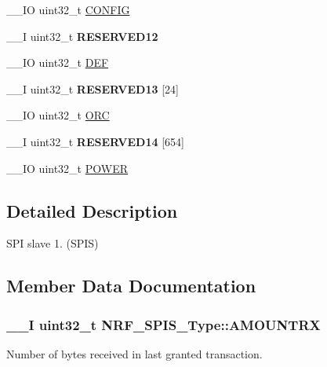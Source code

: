 \begin{DoxyCompactItemize}
\item 
\+\_\+\+\_\+\+I\+O uint32\+\_\+t \hyperlink{struct_n_r_f___s_p_i_s___type_a8a3497d5199eef5a3fc0d966857ad5a6}{C\+O\+N\+F\+I\+G}
\item 
\hypertarget{struct_n_r_f___s_p_i_s___type_ab14765fd89d9625fcff7627e9d61ef22}{}\+\_\+\+\_\+\+I uint32\+\_\+t {\bfseries R\+E\+S\+E\+R\+V\+E\+D12}\label{struct_n_r_f___s_p_i_s___type_ab14765fd89d9625fcff7627e9d61ef22}

\item 
\+\_\+\+\_\+\+I\+O uint32\+\_\+t \hyperlink{struct_n_r_f___s_p_i_s___type_ad04af03c7cf95dd2e789d87e4aba573f}{D\+E\+F}
\item 
\hypertarget{struct_n_r_f___s_p_i_s___type_a6c280b5aecac6bf0cd7d707771d43509}{}\+\_\+\+\_\+\+I uint32\+\_\+t {\bfseries R\+E\+S\+E\+R\+V\+E\+D13} \mbox{[}24\mbox{]}\label{struct_n_r_f___s_p_i_s___type_a6c280b5aecac6bf0cd7d707771d43509}

\item 
\+\_\+\+\_\+\+I\+O uint32\+\_\+t \hyperlink{struct_n_r_f___s_p_i_s___type_aa70d83790facd1d9564ee423d2927a81}{O\+R\+C}
\item 
\hypertarget{struct_n_r_f___s_p_i_s___type_a9926ca2cecd7b8a03c69df007c26ec54}{}\+\_\+\+\_\+\+I uint32\+\_\+t {\bfseries R\+E\+S\+E\+R\+V\+E\+D14} \mbox{[}654\mbox{]}\label{struct_n_r_f___s_p_i_s___type_a9926ca2cecd7b8a03c69df007c26ec54}

\item 
\+\_\+\+\_\+\+I\+O uint32\+\_\+t \hyperlink{struct_n_r_f___s_p_i_s___type_aca78c0bd9fdf802fcf55933786812097}{P\+O\+W\+E\+R}
\end{DoxyCompactItemize}


\subsection{Detailed Description}
S\+P\+I slave 1. (S\+P\+I\+S) 

\subsection{Member Data Documentation}
\hypertarget{struct_n_r_f___s_p_i_s___type_ac14965c1685a4fe6d5967cf307947a2a}{}
\subsubsection[{A\+M\+O\+U\+N\+T\+R\+X}]{\setlength{\rightskip}{0pt plus 5cm}\+\_\+\+\_\+\+I uint32\+\_\+t N\+R\+F\+\_\+\+S\+P\+I\+S\+\_\+\+Type\+::\+A\+M\+O\+U\+N\+T\+R\+X}\label{struct_n_r_f___s_p_i_s___type_ac14965c1685a4fe6d5967cf307947a2a}
Number of bytes received in last granted transaction. \hypertarget{struct_n_r_f___s_p_i_s___type_a7ea61f6a50faa8df40de5a141b684c02}{}
